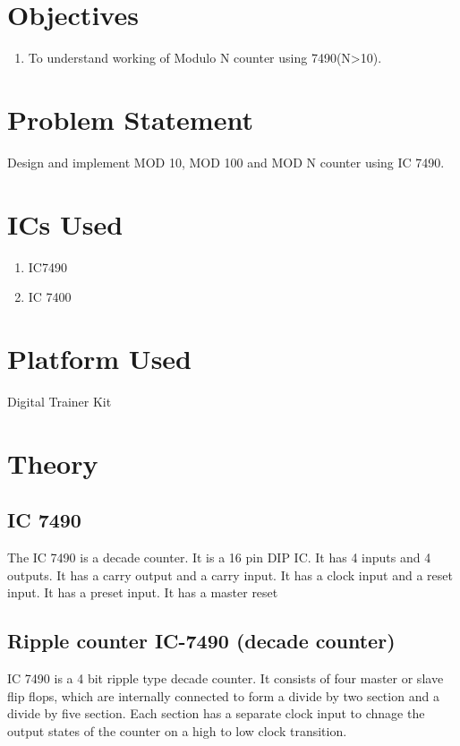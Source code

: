 \documentclass[11pt]{article}
\begin{document}
\tableofcontents
\thispagestyle{empty}
\clearpage


\setcounter{page}{1}
\section{Objectives}
\begin{enumerate}
	\item To understand working of Modulo N counter using 7490(N>10).
\end{enumerate}

\section{Problem Statement}
Design and implement MOD 10, MOD 100 and MOD N counter using IC 7490.

\section{ICs Used}

\begin{enumerate}
	\item IC7490
	\item IC 7400
\end{enumerate}

\section{Platform Used}
Digital Trainer Kit

\section{Theory}

\subsection{IC 7490}

The IC 7490 is a decade counter. It is a 16 pin DIP IC. It has 4 inputs and 4 outputs. It has a carry output and a carry input. It has a clock input and a reset input. It has a preset input. It has a master reset

\subsection{Ripple counter IC-7490 (decade counter)}

IC 7490 is a 4 bit ripple type decade counter. It consists of four master or slave flip flops, which are internally connected to form a divide by two section and a divide by five section. Each section has a separate clock input to chnage the output states of the counter on a high to low clock transition. 
\end{document}
